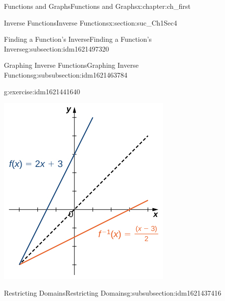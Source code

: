 \documentclass[oneside,10pt,]{book}
\numberwithin{equation}{section}
\begin{document}
\begin{chapterptx}{Functions and Graphs}{}{Functions and Graphs}{}{}{x:chapter:ch_first}
\begin{sectionptx}{Inverse Functions}{}{Inverse Functions}{}{}{x:section:suc_Ch1Sec4}
\begin{subsectionptx}{Finding a Function’s Inverse}{}{Finding a Function’s Inverse}{}{}{g:subsection:idm1621497320}
\begin{subsubsectionptx}{Graphing Inverse Functions}{}{Graphing Inverse Functions}{}{}{g:subsubsection:idm1621463784}
\begin{inlineexercise}{}{g:exercise:idm1621441640}
\begin{image}{0.25}{0.5}{0.25}
\includegraphics[width=\linewidth]{external/CNX_Calc_Figure_01_04_011.jpg}
\end{image}%
%
\end{inlineexercise}%
\end{subsubsectionptx}
%
%
\typeout{************************************************}
\typeout{************************************************}
%
\begin{subsubsectionptx}{Restricting Domains}{}{Restricting Domains}{}{}{g:subsubsection:idm1621437416}

\end{subsubsectionptx}
\end{subsectionptx}
\end{sectionptx}
\end{chapterptx}
\end{document}
